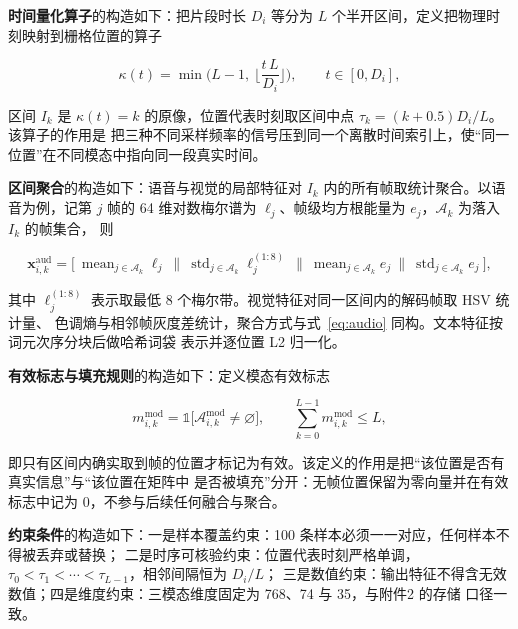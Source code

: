 \documentclass[bwprint]{gmcmthesis}
\begin{document}
\textbf{时间量化算子}的构造如下：把片段时长 $D_i$ 等分为 $L$ 个半开区间，定义把物理时刻映射到栅格位置的算子

\begin{equation}
\kappa(t)=\min\Big(L-1,\ \Big\lfloor \frac{t\,L}{D_i}\Big\rfloor\Big),
\qquad t\in[0,D_i],
\label{eq:kappa}
\end{equation}

区间 $I_k$ 是 $\kappa(t)=k$ 的原像，位置代表时刻取区间中点 $\tau_k=(k+0.5)D_i/L$。该算子的作用是
把三种不同采样频率的信号压到同一个离散时间索引上，使“同一位置”在不同模态中指向同一段真实时间。

\textbf{区间聚合}的构造如下：语音与视觉的局部特征对 $I_k$ 内的所有帧取统计聚合。以语音为例，记第 $j$ 帧的
64 维对数梅尔谱为 $\boldsymbol{\ell}_j$、帧级均方根能量为 $e_j$，$\mathcal{A}_k$ 为落入 $I_k$ 的帧集合，
则

\begin{equation}
\mathbf{x}^{\mathrm{aud}}_{i,k}=
\Big[\ \operatorname{mean}_{j\in\mathcal{A}_k}\boldsymbol{\ell}_j\ \Big\|\
\operatorname{std}_{j\in\mathcal{A}_k}\boldsymbol{\ell}^{(1:8)}_j\ \Big\|\
\operatorname{mean}_{j\in\mathcal{A}_k} e_j\ \Big\|\
\operatorname{std}_{j\in\mathcal{A}_k} e_j\ \Big],
\label{eq:audio}
\end{equation}

其中 $\boldsymbol{\ell}^{(1:8)}_j$ 表示取最低 8 个梅尔带。视觉特征对同一区间内的解码帧取 HSV 统计量、
色调熵与相邻帧灰度差统计，聚合方式与式~\eqref{eq:audio} 同构。文本特征按词元次序分块后做哈希词袋
表示并逐位置 L2 归一化。

\textbf{有效标志与填充规则}的构造如下：定义模态有效标志

\begin{equation}
m^{\mathrm{mod}}_{i,k}=\mathbb{1}\big[\mathcal{A}^{\mathrm{mod}}_{i,k}\neq\varnothing\big],
\qquad
\sum_{k=0}^{L-1} m^{\mathrm{mod}}_{i,k}\le L,
\label{eq:valid}
\end{equation}

即只有区间内确实取到帧的位置才标记为有效。该定义的作用是把“该位置是否有真实信息”与“该位置在矩阵中
是否被填充”分开：无帧位置保留为零向量并在有效标志中记为 0，不参与后续任何融合与聚合。

\textbf{约束条件}的构造如下：一是样本覆盖约束：100 条样本必须一一对应，任何样本不得被丢弃或替换；
二是时序可核验约束：位置代表时刻严格单调，$\tau_0<\tau_1<\cdots<\tau_{L-1}$，相邻间隔恒为 $D_i/L$；
三是数值约束：输出特征不得含无效数值；四是维度约束：三模态维度固定为 768、74 与 35，与附件2 的存储
口径一致。
\end{document}
